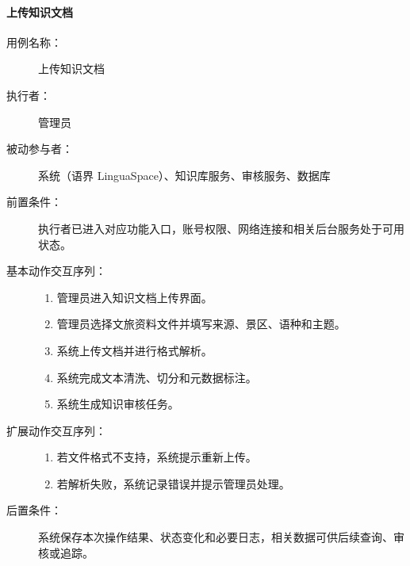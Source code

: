 \paragraph{上传知识文档}
\begin{description}
  \item[用例名称：] 上传知识文档
  \item[执行者：] 管理员
  \item[被动参与者：] 系统（语界 LinguaSpace）、知识库服务、审核服务、数据库
  \item[前置条件：] 执行者已进入对应功能入口，账号权限、网络连接和相关后台服务处于可用状态。
  \item[基本动作交互序列：]
  \begin{enumerate}
    \item 管理员进入知识文档上传界面。
    \item 管理员选择文旅资料文件并填写来源、景区、语种和主题。
    \item 系统上传文档并进行格式解析。
    \item 系统完成文本清洗、切分和元数据标注。
    \item 系统生成知识审核任务。
  \end{enumerate}
  \item[扩展动作交互序列：]
  \begin{enumerate}
    \item[3a.] 若文件格式不支持，系统提示重新上传。
    \item[4a.] 若解析失败，系统记录错误并提示管理员处理。
  \end{enumerate}
  \item[后置条件：] 系统保存本次操作结果、状态变化和必要日志，相关数据可供后续查询、审核或追踪。
\end{description}

